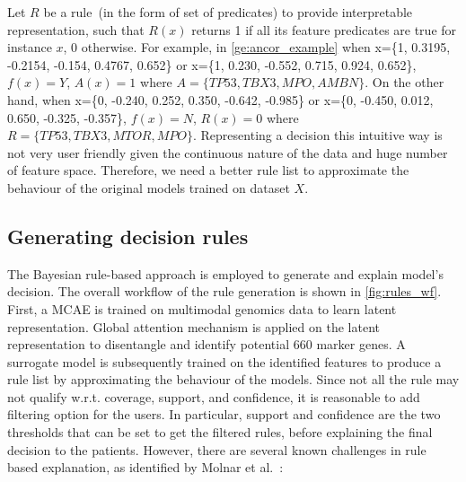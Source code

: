 \hspace*{3.5mm} Let $R$ be a rule~(in the form of set of predicates) to provide interpretable representation, such that $R(x)$ returns 1 if all its feature predicates are true for instance $x$, 0 otherwise. For example, in \cref{ge:ancor_example} when x=\{1, 0.3195, -0.2154, -0.154, 0.4767, 0.652\} or x=\{1, 0.230, -0.552, 0.715, 0.924, 0.652\}, $f(x)=Y$, $A(x)=1$ where $A=\{TP53, TBX3, MPO, AMBN\}$. On the other hand, when x=\{0, -0.240, 0.252, 0.350, -0.642, -0.985\} or x=\{0, -0.450, 0.012, 0.650, -0.325, -0.357\}, $f(x)=N$, $R(x)=0$ where $R=\{TP53, TBX3, MTOR, MPO\}$. Representing a decision this intuitive way is not very user friendly given the continuous nature of the data and huge number of feature space. Therefore, we need a better rule list to approximate the behaviour of the original models trained on dataset $X$. 

\subsection{Generating decision rules}
The Bayesian rule-based approach is employed to generate and explain model's decision. The overall workflow of the rule generation is shown in \cref{fig:rules_wf}. First, a MCAE is trained on multimodal genomics data to learn latent representation. Global attention mechanism is applied on the latent representation to disentangle and identify potential 660 marker genes. A surrogate model is subsequently trained on the identified features to produce a rule list by approximating the behaviour of the  models. Since not all the rule may not qualify w.r.t. coverage, support, and confidence, it is reasonable to add filtering option for the users. In particular, support and confidence are the two thresholds that can be set to get the filtered rules, before explaining the final decision to the patients. However, there are several known challenges in rule based explanation, as identified by Molnar et al.~\cite{molnar2019interpretable}:  

